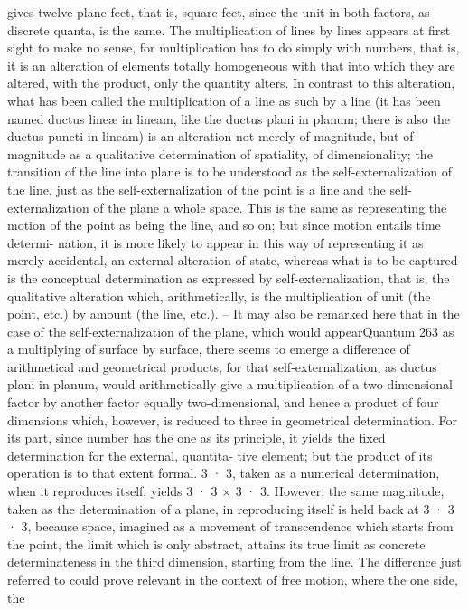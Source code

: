 gives twelve plane-feet, that is, square-feet, since the unit in both factors,
as discrete quanta, is the same. The multiplication of lines by lines appears
at first sight to make no sense, for multiplication has to do simply with
numbers, that is, it is an alteration of elements totally homogeneous with
that into which they are altered, with the product, only the quantity alters.
In contrast to this alteration, what has been called the multiplication of
a line as such by a line (it has been named ductus lineæ in lineam, like
the ductus plani in planum; there is also the ductus puncti in lineam) is
an alteration not merely of magnitude, but of magnitude as a qualitative
determination of spatiality, of dimensionality; the transition of the line into
plane is to be understood as the self-externalization of the line, just as the
self-externalization of the point is a line and the self-externalization of the
plane a whole space. This is the same as representing the motion of the
point as being the line, and so on; but since motion entails time determi-
nation, it is more likely to appear in this way of representing it as merely
accidental, an external alteration of state, whereas what is to be captured is
the conceptual determination as expressed by self-externalization, that is,
the qualitative alteration which, arithmetically, is the multiplication of unit
(the point, etc.) by amount (the line, etc.). – It may also be remarked here
that in the case of the self-externalization of the plane, which would appearQuantum
263
as a multiplying of surface by surface, there seems to emerge a difference
of arithmetical and geometrical products, for that self-externalization, as
ductus plani in planum, would arithmetically give a multiplication of a
two-dimensional factor by another factor equally two-dimensional, and
hence a product of four dimensions which, however, is reduced to three
in geometrical determination. For its part, since number has the one as
its principle, it yields the fixed determination for the external, quantita-
tive element; but the product of its operation is to that extent formal.
3 · 3, taken as a numerical determination, when it reproduces itself, yields
3 · 3 × 3 · 3. However, the same magnitude, taken as the determination of a
plane, in reproducing itself is held back at 3 · 3 · 3, because space, imagined
as a movement of transcendence which starts from the point, the limit
which is only abstract, attains its true limit as concrete determinateness in
the third dimension, starting from the line. The difference just referred to
could prove relevant in the context of free motion, where the one side, the
